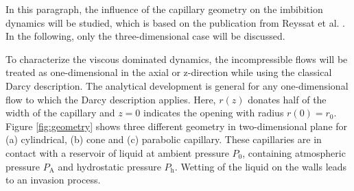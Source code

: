 \documentclass[aip, amsmath, amssymb, reprint, twocolumn, floatfix]{revtex4-1}
\newcommand{\Pa}{P_\mathrm{A}}
\newcommand{\Ph}{P_\mathrm{h}}
\begin{document}
In this paragraph, the influence of the capillary geometry on the imbibition dynamics will be studied, which is based on the publication from Reyssat et al. \cite{Reyssat2008}. In the following, only the three-dimensional case will be discussed.
\bigskip

To characterize the viscous dominated dynamics, the incompressible flows will be treated as one-dimensional in the axial or z-direction while using the classical Darcy description. The analytical development is general for any one-dimensional flow to which the Darcy description applies. Here, $r(z)$ donates half of the width of the capillary and $z = 0$ indicates the opening with radius $r(0) = r_0$. Figure \ref{fig:geometry} shows three different geometry in two-dimensional plane for (a) cylindrical, (b) cone and (c) parabolic capillary. These capillaries are in contact with a reservoir of liquid at ambient pressure $P_0$, containing atmospheric pressure $\Pa$ and hydrostatic pressure $\Ph$. Wetting of the liquid on the walls leads to an invasion process.

\begin{center}
	\captionsetup{type=figure}
	
	\label{fig:geometry}
\end{center}
\end{document}
